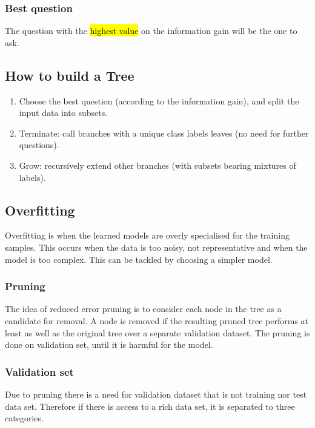 \documentclass[12pt]{article}
\numberwithin{equation}{section}
\begin{document}
\subsubsection{Best question}
The question with the \hl{highest value} on the information gain will be the one to ask.
\subsection{How to build a Tree}
\begin{enumerate}
\item Choose the best question (according to the information
gain), and split the input data into subsets.
\item Terminate: call branches with a unique class labels leaves
(no need for further questions).
\item Grow: recursively extend other branches (with subsets bearing mixtures of labels).
\end{enumerate}
\subsection{Overfitting}
Overfitting is when the learned models are overly specialised for the training samples. This occurs when the data is too noisy, not representative and when the model is too complex. This can be tackled by choosing a simpler model.
\subsubsection{Pruning}
The idea of reduced error pruning is to consider each node in the tree as a candidate for removal. A node is removed if the resulting pruned tree performs at least as well as the original tree over a separate validation dataset. The pruning is done on validation set, until it is harmful for the model.
\subsubsection{Validation set}
Due to pruning there is a need for validation dataset that is not training nor test data set. Therefore if there is access to a rich data set, it is separated to three categories. 
\end{document}
